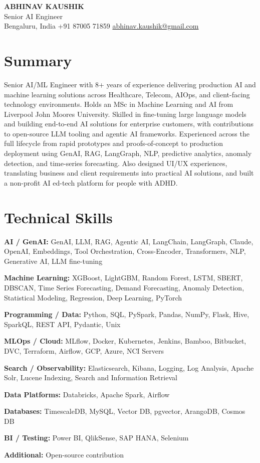 \documentclass[10pt,a4paper]{article}
\begin{document}
\begin{center}
  {\LARGE\bfseries ABHINAV KAUSHIK}\\[2pt]
  {\large Senior AI Engineer}\\[2pt]
  Bengaluru, India \textbar{} +91 87005 71859 \textbar{} \href{mailto:abhinav.kaushik@gmail.com}{abhinav.kaushik@gmail.com}
\end{center}

\section{Summary}
Senior AI/ML Engineer with 8+ years of experience delivering production AI and machine learning solutions across Healthcare, Telecom, AIOps, and client-facing technology environments. Holds an MSc in Machine Learning and AI from Liverpool John Moores University. Skilled in fine-tuning large language models and building end-to-end AI solutions for enterprise customers, with contributions to open-source LLM tooling and agentic AI frameworks. Experienced across the full lifecycle from rapid prototypes and proofs-of-concept to production deployment using GenAI, RAG, LangGraph, NLP, predictive analytics, anomaly detection, and time-series forecasting. Also designed UI/UX experiences, translating business and client requirements into practical AI solutions, and built a non-profit AI ed-tech platform for people with ADHD.

\section{Technical Skills}
\textbf{AI / GenAI:} GenAI, LLM, RAG, Agentic AI, LangChain, LangGraph, Claude, OpenAI, Embeddings, Tool Orchestration, Cross-Encoder, Transformers, NLP, Generative AI, LLM fine-tuning\par
\textbf{Machine Learning:} XGBoost, LightGBM, Random Forest, LSTM, SBERT, DBSCAN, Time Series Forecasting, Demand Forecasting, Anomaly Detection, Statistical Modeling, Regression, Deep Learning, PyTorch\par
\textbf{Programming / Data:} Python, SQL, PySpark, Pandas, NumPy, Flask, Hive, SparkQL, REST API, Pydantic, Unix\par
\textbf{MLOps / Cloud:} MLflow, Docker, Kubernetes, Jenkins, Bamboo, Bitbucket, DVC, Terraform, Airflow, GCP, Azure, NCI Servers\par
\textbf{Search / Observability:} Elasticsearch, Kibana, Logging, Log Analysis, Apache Solr, Lucene Indexing, Search and Information Retrieval\par
\textbf{Data Platforms:} Databricks, Apache Spark, Airflow\par
\textbf{Databases:} TimescaleDB, MySQL, Vector DB, pgvector, ArangoDB, Cosmos DB\par
\textbf{BI / Testing:} Power BI, QlikSense, SAP HANA, Selenium\par
\textbf{Additional:} Open-source contribution\par
\end{document}
